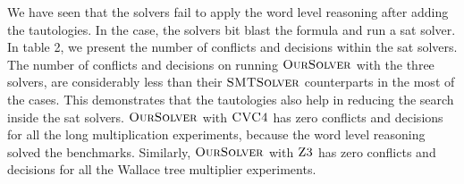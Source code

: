 We have seen that the solvers fail to apply the word level reasoning
after adding the tautologies.
%
In the case, the solvers bit blast the formula and run a sat solver.
%
In table 2, we present the number of conflicts and decisions within
the sat solvers.
%
The number of conflicts and decisions on running $\textsc{OurSolver}$ with the
three solvers, are considerably less than their $\textsc{SMTSolver}$
counterparts in the most of the cases.
%
This demonstrates that the tautologies also help in reducing the
search inside the sat solvers. 
%
$\textsc{OurSolver}$ with $\textsc{CVC4}$ has zero conflicts and
decisions for all the long multiplication experiments, because the 
word level reasoning solved the benchmarks.
%
Similarly, $\textsc{OurSolver}$ with $\textsc{Z3}$ has zero conflicts and decisions for all the
Wallace tree multiplier experiments.


%








